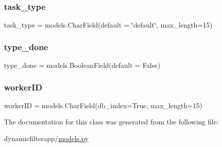 \mbox{\label{classdynamicfilterapp_1_1models_1_1_task_ab8d9e3d1f9fdf95a31d7b4ce32768eab}} 
\subsubsection{\texorpdfstring{task\_type}{task\_type}}
{\footnotesize\ttfamily task\+\_\+type = models.\+Char\+Field(default = \char`\"{}default\char`\"{}, max\+\_\+length=15)\hspace{0.3cm}{\ttfamily [static]}}

\mbox{\label{classdynamicfilterapp_1_1models_1_1_task_a47b4d7e0fa28b08ed57f086799b026d2}} 
\subsubsection{\texorpdfstring{type\_done}{type\_done}}
{\footnotesize\ttfamily type\+\_\+done = models.\+Boolean\+Field(default = False)\hspace{0.3cm}{\ttfamily [static]}}

\mbox{\label{classdynamicfilterapp_1_1models_1_1_task_ab569d6674e112f916cbe81a2304d418f}} 
\subsubsection{\texorpdfstring{workerID}{workerID}}
{\footnotesize\ttfamily worker\+ID = models.\+Char\+Field(db\+\_\+index=True, max\+\_\+length=15)\hspace{0.3cm}{\ttfamily [static]}}



The documentation for this class was generated from the following file\+:\begin{DoxyCompactItemize}
\item 
dynamicfilterapp/\mbox{\hyperlink{models_8py}{models.\+py}}\end{DoxyCompactItemize}

